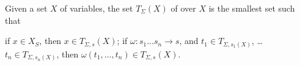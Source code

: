 \begin{Definition}[Label=DefTerms,Title=Terms over $\Sigma$]
Given a set $X$ of variables, the set $T_\Sigma(X)$ of
 over $X$ is the smallest set such that 
\begin{List}[Label=TermFormationRules,ListType=itemize]
  \ListItem
  if $x\in X_S$, then $x\in T_{\Sigma, s}(X)$;
  \ListItem
  if $\omega:s_1\ldots s_n\rightarrow s$, and
  $t_1\in T_{\Sigma,{s_1}(X)}$, \ldots
  $t_n\in T_{\Sigma,{s_n}(X)}$, then 
  $\omega(t_1,\ldots, t_n)\in T_{\Sigma,s}(X)$.
\end{List}
\end{Definition}